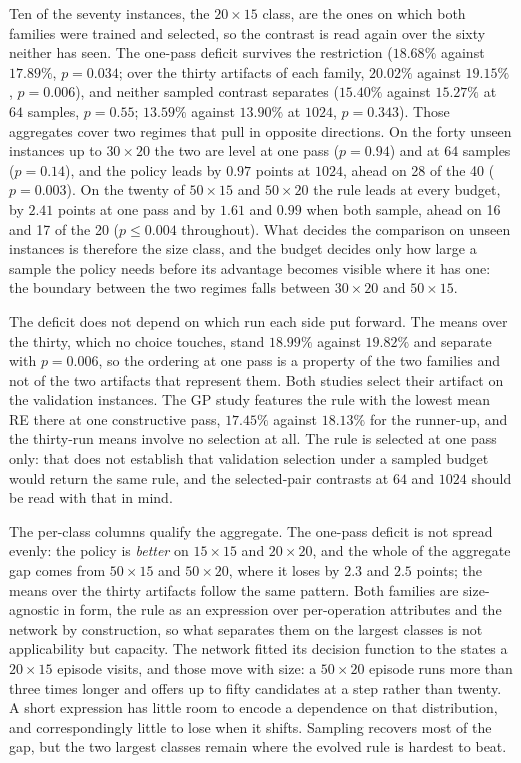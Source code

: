 \documentclass[preprint,authoryear,12pt]{elsarticle}
\theoremstyle{definition}
\theoremstyle{remark}
\begin{document}
Ten of the seventy instances, the $20{\times}15$ class, are the ones
on which both families were trained and selected, so the contrast is
read again over the sixty neither has seen. The one-pass deficit
survives the restriction ($18.68\%$ against $17.89\%$, $p=0.034$; over
the thirty artifacts of each family, $20.02\%$ against $19.15\%$,
$p=0.006$), and neither sampled contrast separates ($15.40\%$ against
$15.27\%$ at $64$ samples, $p=0.55$; $13.59\%$ against $13.90\%$ at
$1024$, $p=0.343$). Those aggregates cover two regimes that pull in
opposite directions. On the forty unseen instances up to
$30{\times}20$ the two are level at one pass ($p=0.94$) and at $64$
samples ($p=0.14$), and the policy leads by $0.97$ points at $1024$,
ahead on 28 of the 40 ($p=0.003$). On the twenty of $50{\times}15$
and $50{\times}20$ the rule leads at every budget, by $2.41$ points at
one pass and by $1.61$ and $0.99$ when both sample, ahead on 16 and 17
of the 20 ($p\le0.004$ throughout). What decides the comparison on
unseen instances is therefore the size class, and the budget decides
only how large a sample the policy needs before its advantage becomes
visible where it has one: the boundary between the two regimes falls
between $30{\times}20$ and $50{\times}15$.

The deficit does not depend on which run each side put forward. The
means over the thirty, which no choice touches, stand $18.99\%$
against $19.82\%$ and separate with $p=0.006$, so the ordering at one
pass is a property of the two families and not of the two artifacts
that represent them. Both studies select their artifact on the
validation instances. The GP study features the rule with the lowest
mean RE there at one constructive pass, $17.45\%$ against $18.13\%$
for the runner-up, and the thirty-run means involve no selection at
all. The rule is selected at one pass only: that does not establish
that validation selection under a sampled budget would return the
same rule, and the selected-pair contrasts at $64$ and $1024$ should
be read with that in mind.

The per-class columns qualify the aggregate. The one-pass deficit is
not spread evenly: the policy is \emph{better} on $15{\times}15$
and $20{\times}20$, and the whole of the aggregate gap comes from
$50{\times}15$ and $50{\times}20$, where it loses by $2.3$ and $2.5$
points; the means over the thirty artifacts follow the same pattern.
Both families are size-agnostic in form, the rule as an expression
over per-operation attributes and the network by construction, so
what separates them on the largest classes is not applicability but
capacity. The network fitted its decision function to the states a
$20{\times}15$ episode visits, and those move with size: a
$50{\times}20$ episode runs more than three times longer and offers
up to fifty candidates at a step rather than twenty. A short
expression has little room to encode a dependence on that
distribution, and correspondingly little to lose when it shifts.
Sampling recovers most of the gap, but the two largest classes remain
where the evolved rule is hardest to beat.
\end{document}
